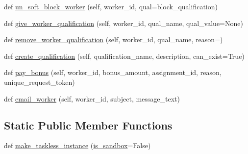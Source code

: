 \begin{DoxyCompactItemize}
\item 
def \hyperlink{classparlai_1_1mturk_1_1core_1_1mturk__manager_1_1MTurkManager_acaeeefcf862de982fdfcbeb26036aab9}{un\+\_\+soft\+\_\+block\+\_\+worker} (self, worker\+\_\+id, qual=\textquotesingle{}block\+\_\+qualification\textquotesingle{})
\item 
def \hyperlink{classparlai_1_1mturk_1_1core_1_1mturk__manager_1_1MTurkManager_a6df9024b28007db08c481a218e6b4fca}{give\+\_\+worker\+\_\+qualification} (self, worker\+\_\+id, qual\+\_\+name, qual\+\_\+value=None)
\item 
def \hyperlink{classparlai_1_1mturk_1_1core_1_1mturk__manager_1_1MTurkManager_aa96771f455f9e041b4d0105ef20de99a}{remove\+\_\+worker\+\_\+qualification} (self, worker\+\_\+id, qual\+\_\+name, reason=\textquotesingle{}\textquotesingle{})
\item 
def \hyperlink{classparlai_1_1mturk_1_1core_1_1mturk__manager_1_1MTurkManager_a663af5f8cfa1c984439c2344d528f223}{create\+\_\+qualification} (self, qualification\+\_\+name, description, can\+\_\+exist=True)
\item 
def \hyperlink{classparlai_1_1mturk_1_1core_1_1mturk__manager_1_1MTurkManager_ad4ee676f38d610a5eb43aadf105237f4}{pay\+\_\+bonus} (self, worker\+\_\+id, bonus\+\_\+amount, assignment\+\_\+id, reason, unique\+\_\+request\+\_\+token)
\item 
def \hyperlink{classparlai_1_1mturk_1_1core_1_1mturk__manager_1_1MTurkManager_afd2e53ad36f1975af45cc64c0940a41f}{email\+\_\+worker} (self, worker\+\_\+id, subject, message\+\_\+text)
\end{DoxyCompactItemize}
\subsection*{Static Public Member Functions}
\begin{DoxyCompactItemize}
\item 
def \hyperlink{classparlai_1_1mturk_1_1core_1_1mturk__manager_1_1MTurkManager_a6116c50263088c2c560f41be7b7bb5f3}{make\+\_\+taskless\+\_\+instance} (\hyperlink{classparlai_1_1mturk_1_1core_1_1mturk__manager_1_1MTurkManager_a03da264fcd7749e299714ba9ea0f1af0}{is\+\_\+sandbox}=False)
\end{DoxyCompactItemize}
